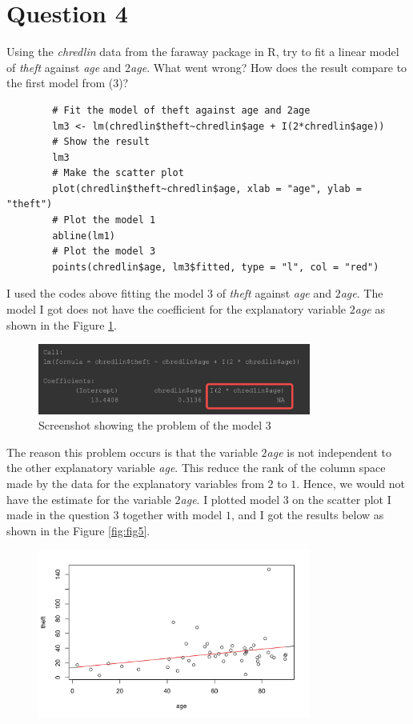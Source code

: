 \section{Question 4}

\begin{question}
    Using the \textit{chredlin} data from the faraway package in R, try to fit a linear model of \textit{theft} against \textit{age} and 2\textit{age}. What went wrong? How does the result compare to the first model from (3)?
\end{question}

\begin{answer}
    \begin{verbatim}
        # Fit the model of theft against age and 2age
        lm3 <- lm(chredlin$theft~chredlin$age + I(2*chredlin$age))
        # Show the result
        lm3
        # Make the scatter plot
        plot(chredlin$theft~chredlin$age, xlab = "age", ylab = "theft")
        # Plot the model 1
        abline(lm1)
        # Plot the model 3
        points(chredlin$age, lm3$fitted, type = "l", col = "red")
    \end{verbatim}
    I used the codes above fitting the model $3$ of \textit{theft} against \textit{age} and \textit{$2$age}. The model I got does not have the coefficient for the explanatory variable \textit{$2$age} as shown in the Figure \ref{fig:fig4}.
    \begin{figure}[H]
        \centering
        \includegraphics[width=0.8\textwidth]{Figure 4.jpeg}
        \caption{\label{fig:fig4}Screenshot showing the problem of the model 3}
    \end{figure}
    The reason this problem occurs is that the variable \textit{$2$age} is not independent to the other explanatory variable \textit{age}. This reduce the rank of the column space made by the data for the explanatory variables from $2$ to $1$. Hence, we would not have the estimate for the variable \textit{$2$age}. I plotted model $3$ on the scatter plot I made in the question $3$ together with model $1$, and I got the results below as shown in the Figure \ref{fig:fig5}.
    \begin{figure}[H]
        \centering
        \includegraphics[width=0.8\textwidth]{Figure 5.png}

\end{figure}
\end{answer}
